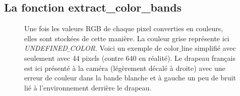\documentclass{article}
\begin{document}
    \subsection{La fonction extract\_color\_bands}
    \label{extract_color_bands}
    \begin{figure}[!ht] %
        \begin{center}
        \end{center}
        \caption{Une fois les valeurs RGB de chaque pixel converties en couleurs, elles sont stockées de cette manière. La couleur grise représente ici \textit{UNDEFINED$\_$COLOR}. Voici un exemple de \textcolor{bleu}{color$\_$line} simplifié avec seulement avec 44 pixels (contre 640 en réalité). Le drapeau français est ici présenté à la caméra (légèrement décalé à droite) avec une erreur de couleur dans la bande blanche et à gauche un peu de bruit lié à l'environnement derrière le drapeau.}
    \end{figure}

    \vspace{5mm}
\end{document}
